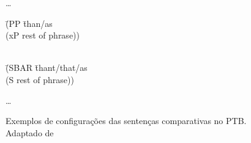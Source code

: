 \begin{figure}[!h]
    \centering
    \begin{minipage}{.3\linewidth}
        \ldots
        \begin{tabbing}
            \=(PP \=than/as\+\\
            \>    (xP rest of phrase))\\
            \>\\
        \end{tabbing}
        \begin{tabbing}
            \=(SBAR \=thant/that/as\+\\
            \>    (S rest of phrase))\\
        \end{tabbing}
        \ldots
    \end{minipage}
    \caption[Exemplos de configurações das sentenças comparativas no PTB]{Exemplos de configurações das sentenças comparativas no PTB. Adaptado de }
    \label{fig:ptb_exemplo_comp}
\end{figure}




